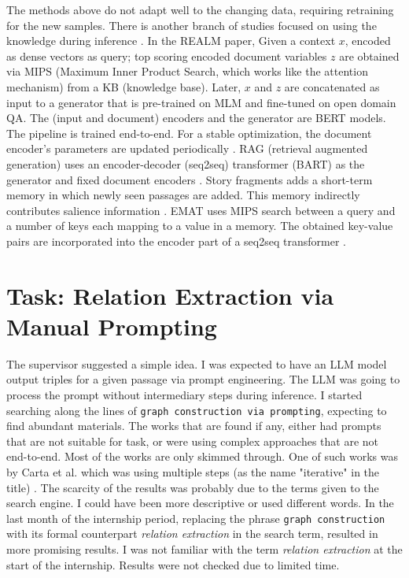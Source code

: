 \documentclass{article}
\begin{document}
The methods above do not adapt well to the changing data, requiring retraining for the new samples. There is another branch of studies focused on using the knowledge during inference \cite{pan_unifying_2024}. In the REALM paper, Given a context $x$, encoded as dense vectors as query; top scoring encoded document variables $z$ are obtained via MIPS (Maximum Inner Product Search, which works like the attention mechanism) from a KB (knowledge base). Later, $x$ and $z$ are concatenated as input to a generator that is pre-trained on MLM and fine-tuned on open domain QA. The (input and document) encoders and the generator are BERT models. The pipeline is trained end-to-end. For a stable optimization, the document encoder’s parameters are updated periodically \cite{guu_realm_2020}. RAG (retrieval augmented generation) uses an encoder-decoder (seq2seq) transformer (BART) as the generator and fixed document encoders \cite{lewis_retrieval-augmented_2021}. Story fragments adds a short-term memory in which newly seen passages are added. This memory indirectly contributes salience information \cite{wilmot_memory_2021}. EMAT uses MIPS search between a query and a number of keys each mapping to a value in a memory. The obtained key-value pairs are incorporated into the encoder part of a seq2seq transformer \cite{wu_efficient_2022}. 
\section{Task: Relation Extraction via Manual Prompting}\label{relx_manual_prompt}
The supervisor suggested a simple idea. I was expected to have an LLM model output triples for a given passage via prompt engineering. The LLM was going to process the prompt without intermediary steps during inference. I started searching along the lines of \texttt{graph construction via prompting}, expecting to find abundant materials. The works that are found if any, either had prompts that are not suitable for task, or were using complex approaches that are not end-to-end. Most of the works are only skimmed through. One of such works was by Carta et al. which was using multiple steps (as the name "iterative" in the title) \cite{carta_iterative_2023}. The scarcity of the results was probably due to the terms given to the search engine. I could have been more descriptive or used different words. In the last month of the internship period, replacing the phrase \texttt{graph construction} with its formal counterpart \textit{relation extraction} in the search term, resulted in more promising results. I was not familiar with the term \textit{relation extraction} at the start of the internship. Results were not checked due to limited time. 
\end{document}
